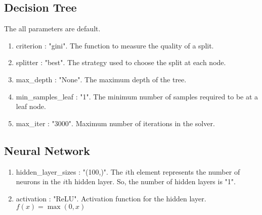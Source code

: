 \documentclass[twocolumn,9pt,a4j]{jarticle}
\begin{document}
	\subsection{Decision Tree}
		The all parameters are default.
		\begin{enumerate}
			\item criterion : "gini". The function to measure the quality of a split.
			\item splitter : "best". The strategy used to choose the split at each node.
			\item max\_depth : "None". The maximum depth of the tree.
			\item min\_samples\_leaf : "1". The minimum number of samples required to be at a leaf node.
			\item max\_iter : "3000". Maximum number of iterations in the solver.
		\end{enumerate}
	\subsection{Neural Network}
		\begin{enumerate}
			\item hidden\_layer\_sizes : "(100,)". The $i$th element represents the number of neurons in the $i$th hidden layer. So, the number of hidden layers is "1".
			\item activation : "ReLU". Activation function for the hidden layer. $ f(x) = \max(0, x)$
		\end{enumerate}
\end{document}
